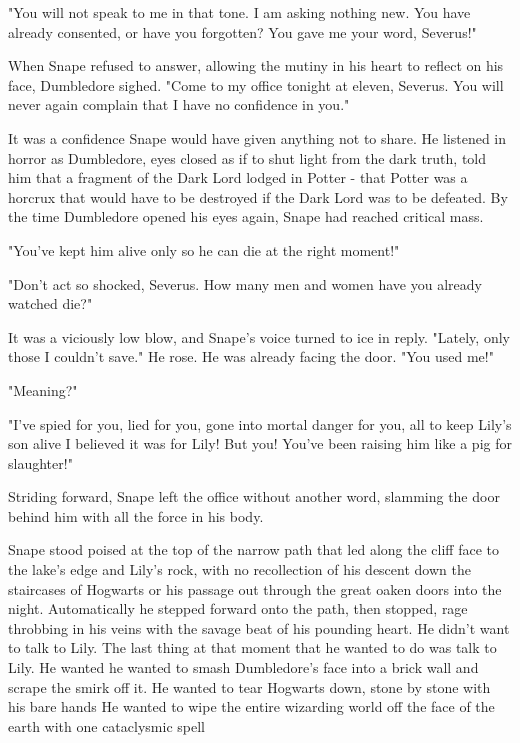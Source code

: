 "You will not speak to me in that tone. I am asking nothing new. You have already consented, or have you forgotten? You gave me your word, Severus!"

When Snape refused to answer, allowing the mutiny in his heart to reflect on his face, Dumbledore sighed. "Come to my office tonight at eleven, Severus. You will never again complain that I have no confidence in you."

It was a confidence Snape would have given anything not to share. He listened in horror as Dumbledore, eyes closed as if to shut light from the dark truth, told him that a fragment of the Dark Lord lodged in Potter - that Potter was a horcrux that would have to be destroyed if the Dark Lord was to be defeated. By the time Dumbledore opened his eyes again, Snape had reached critical mass.

"You've kept him alive only so he can die at the right moment!"

"Don't act so shocked, Severus. How many men and women have you already watched die?"

It was a viciously low blow, and Snape's voice turned to ice in reply. "Lately, only those I couldn't save." He rose. He was already facing the door. "You used me!"

"Meaning?"

"I've spied for you, lied for you, gone into mortal danger for you, all to keep Lily's son alive{\el} I believed it was for Lily! But you! You've been raising him like a pig for slaughter!"

Striding forward, Snape left the office without another word, slamming the door behind him with all the force in his body.

\sbreak

Snape stood poised at the top of the narrow path that led along the cliff face to the lake's edge and Lily's rock, with no recollection of his descent down the staircases of Hogwarts or his passage out through the great oaken doors into the night. Automatically he stepped forward onto the path, then stopped, rage throbbing in his veins with the savage beat of his pounding heart. He didn't want to talk to Lily. The last thing at that moment that he wanted to do was talk to Lily. He wanted{\el} he wanted to smash Dumbledore's face into a brick wall and scrape the smirk off it. He wanted to tear Hogwarts down, stone by stone with his bare hands He wanted to wipe the entire wizarding world off the face of the earth with one cataclysmic spell{\el}

